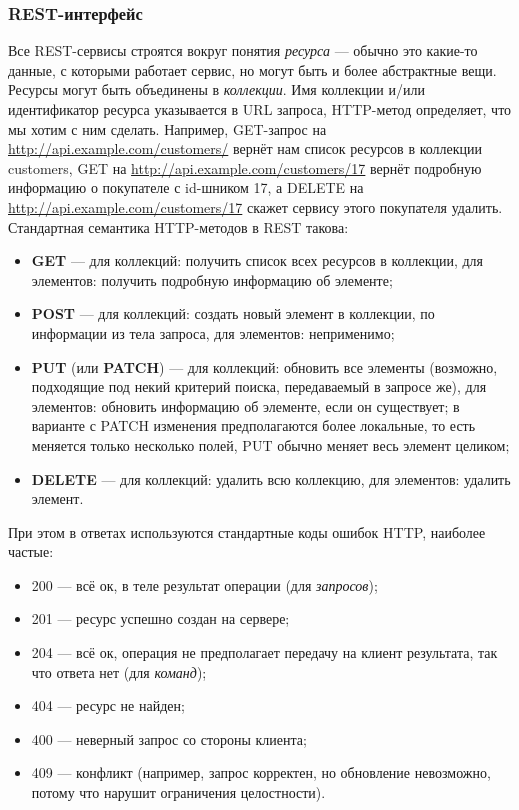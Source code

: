\documentclass{../../text-style}
\begin{document}
\subsubsection{REST-интерфейс}

Все REST-сервисы строятся вокруг понятия \emph{ресурса} --- обычно это какие-то данные, с которыми работает сервис, но могут быть и более абстрактные вещи. Ресурсы могут быть объединены в \emph{коллекции}. Имя коллекции и/или идентификатор ресурса указывается в URL запроса, HTTP-метод определяет, что мы хотим с ним сделать. Например, GET-запрос на \url{http://api.example.com/customers/} вернёт нам список ресурсов в коллекции customers, GET на \url{http://api.example.com/customers/17} вернёт подробную информацию о покупателе с id-шником 17, а DELETE на \url{http://api.example.com/customers/17} скажет сервису этого покупателя удалить. Стандартная семантика HTTP-методов в REST такова:

\begin{itemize}
    \item \textbf{GET} --- для коллекций: получить список всех ресурсов в коллекции, для элементов: получить подробную информацию об элементе;
    \item \textbf{POST} --- для коллекций: создать новый элемент в коллекции, по информации из тела запроса, для элементов: неприменимо;
    \item \textbf{PUT} (или \textbf{PATCH}) --- для коллекций: обновить все элементы (возможно, подходящие под некий критерий поиска, передаваемый в запросе же), для элементов: обновить информацию об элементе, если он существует; в варианте с PATCH изменения предполагаются более локальные, то есть меняется только несколько полей, PUT обычно меняет весь элемент целиком;
    \item \textbf{DELETE} --- для коллекций: удалить всю коллекцию, для элементов: удалить элемент.
\end{itemize}

При этом в ответах используются стандартные коды ошибок HTTP, наиболее частые:

\begin{itemize}
    \item 200 --- всё ок, в теле результат операции (для \emph{запросов});
    \item 201 --- ресурс успешно создан на сервере;
    \item 204 --- всё ок, операция не предполагает передачу на клиент результата, так что ответа нет (для \emph{команд});
    \item 404 --- ресурс не найден;
    \item 400 --- неверный запрос со стороны клиента;
    \item 409 --- конфликт (например, запрос корректен, но обновление невозможно, потому что нарушит ограничения целостности).
\end{itemize}
\end{document}
